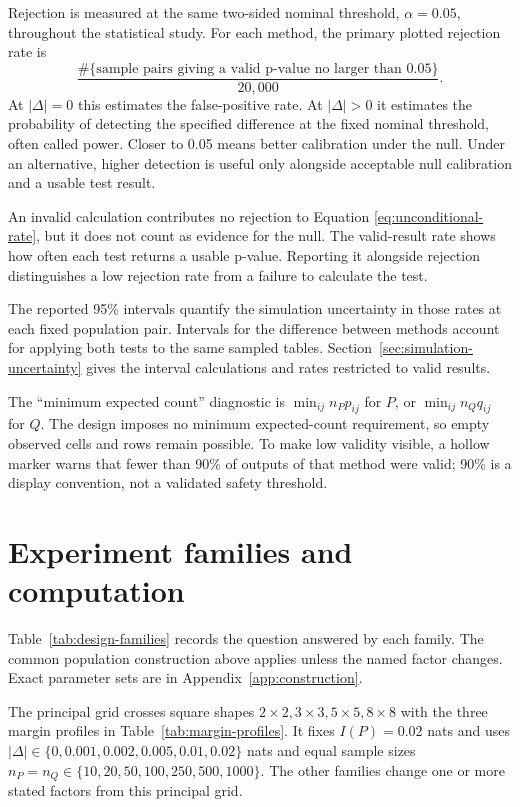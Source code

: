Rejection is measured at the same two-sided nominal threshold,
\(\alpha=0.05\), throughout the statistical study. For each method, the
primary plotted rejection rate is
\begin{equation}
 \frac{\#\{\text{sample pairs giving a valid p-value no larger than }0.05\}}
      {20{,}000}.
 \label{eq:unconditional-rate}
\end{equation}
At \(|\Delta|=0\) this estimates the false-positive rate. At
\(|\Delta|>0\) it estimates the probability of detecting the specified
difference at the fixed nominal threshold, often called power. Closer to
0.05 means better calibration under the null.
Under an alternative, higher detection is useful only alongside acceptable
null calibration and a usable test result.

An invalid calculation contributes no rejection to Equation
\eqref{eq:unconditional-rate}, but it does not count as evidence for the null.
The valid-result rate shows how often each test returns a usable
p-value. Reporting it alongside rejection distinguishes a low rejection
rate from a failure to calculate the test.

The reported 95\% intervals quantify the simulation uncertainty in those
rates at each
fixed population pair. Intervals for the difference between methods account
for applying both tests to the same sampled tables. Section~\ref{sec:simulation-uncertainty}
gives the interval calculations and rates restricted to valid results.

The ``minimum expected count'' diagnostic is
\(\min_{ij}n_Pp_{ij}\) for \(P\), or \(\min_{ij}n_Qq_{ij}\) for \(Q\).
The design imposes no minimum expected-count requirement, so empty observed
cells and rows remain possible.
To make low validity visible, a hollow marker warns that fewer
than 90\% of outputs of that method were valid; 90\% is a display convention,
not a validated safety threshold.

\section{Experiment families and computation}

Table~\ref{tab:design-families} records the question answered by each family.
The common population construction above applies unless the named factor
changes. Exact parameter sets are in Appendix~\ref{app:construction}.

The principal grid crosses square shapes \(2\times2,3\times3,5\times5,8\times8\)
with the three margin profiles in Table~\ref{tab:margin-profiles}. It fixes
\(I(P)=0.02\) nats and uses
\(|\Delta|\in\{0,0.001,0.002,0.005,0.01,0.02\}\) nats and equal
sample sizes \(n_P=n_Q\in\{10,20,50,100,250,500,1000\}\).
The other families change one or more stated factors from this principal
grid.

